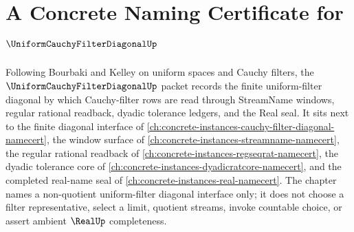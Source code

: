 \chapter{A Concrete Naming Certificate for $\UniformCauchyFilterDiagonalUp$}
\label{ch:concrete-instances-uniform-cauchy-filter-diagonal-namecert}

Following Bourbaki and Kelley on uniform spaces and Cauchy filters, the $\UniformCauchyFilterDiagonalUp$ packet records the finite uniform-filter diagonal by which Cauchy-filter rows are read through StreamName windows, regular rational readback, dyadic tolerance ledgers, and the Real seal. It sits next to the finite diagonal interface of \autoref{ch:concrete-instances-cauchy-filter-diagonal-namecert}, the window surface of \autoref{ch:concrete-instances-streamname-namecert}, the regular rational readback of \autoref{ch:concrete-instances-regseqrat-namecert}, the dyadic tolerance core of \autoref{ch:concrete-instances-dyadicratcore-namecert}, and the completed real-name seal of \autoref{ch:concrete-instances-real-namecert}. The chapter names a non-quotient uniform-filter diagonal interface only; it does not choose a filter representative, select a limit, quotient streams, invoke countable choice, or assert ambient $\RealUp$ completeness.

